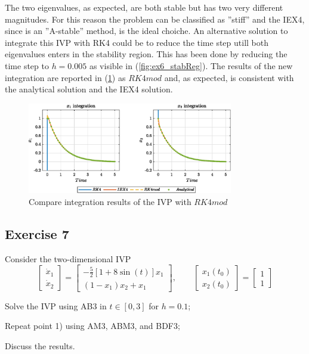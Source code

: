 \documentclass[11pt,a4paper,oneside]{article}
\begin{document}
The two eigenvalues, as expected, are both stable but has two very different magnitudes.
For this reason the problem can be classified as ''stiff'' and the IEX4, since is an ''A-stable'' method, is the ideal choiche.
An alternative solution to integrate this IVP with RK4 could be to reduce the time step utill both eigenvalues enters in the stability region.
This has been done by reducing the time step to $h=0.005$ as visible in (\cref{fig:ex6_stabReg}).
The results of the new integration are reported in (\cref{fig:ex6_integrationMod}) as $RK4mod$ and, as expected, is consistent with the analytical solution and the IEX4 solution.
\begin{figure}[htb]
    \centering
    \includegraphics*[width=0.8\textwidth, keepaspectratio]{ex6_integOutputMod.eps}
    \caption[]{\label{fig:ex6_integrationMod} Compare integration results of the IVP with $RK4mod$}
\end{figure}


\clearpage
\subsection{Exercise 7}

Consider the two-dimensional IVP 
$$\begin{bmatrix}\dot{x}_1 \\ \dot{x}_2\end{bmatrix}=\begin{bmatrix}-\frac{5}{2}\left[1+8\sin(t)\right]x_1 \\ (1-x_1)x_2+x_1\end{bmatrix}, \qquad \begin{bmatrix} x_1(t_0)\\ x_2(t_0)\end{bmatrix}=\begin{bmatrix} 1\\ 1\end{bmatrix}$$
\begin{enumerate*}[label=\arabic*)]
    \item Solve the IVP using AB3 in $t\in[0,3]$ for $h=0.1$;
    \item Repeat point 1) using AM3, ABM3, and BDF3;
    \item Discuss the results.
\end{enumerate*}
\end{document}
